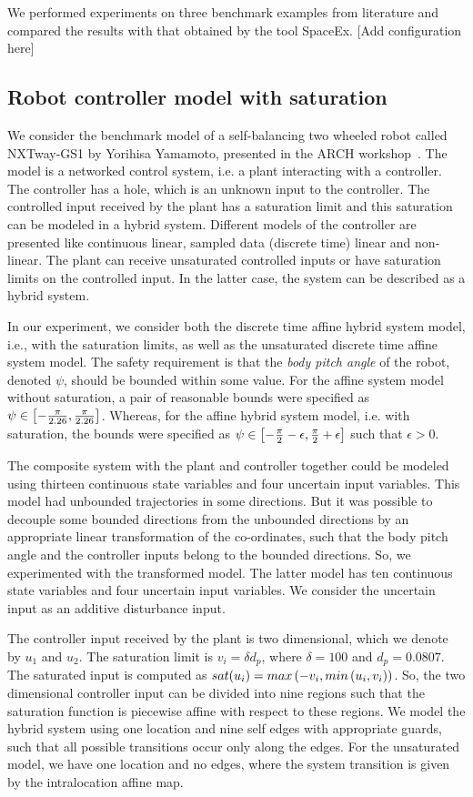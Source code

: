 We performed experiments on three benchmark examples from literature
and compared the results with that obtained by the tool SpaceEx. [Add
  configuration here]

\subsection{Robot controller model with saturation}   We consider the benchmark
model of a self-balancing two wheeled robot called NXTway-GS1 by
Yorihisa Yamamoto, presented in the ARCH workshop~\cite{TODO}.  The
model is a networked control system, i.e. a plant interacting with a
controller.  The controller has a hole, which is an unknown input to
the controller.  The controlled input received by the plant has a
saturation limit and this saturation can be modeled in a hybrid
system.  Different models of the controller are presented like
continuous linear, sampled data (discrete time) linear and non-linear.
The plant can receive unsaturated controlled inputs or have saturation
limits on the controlled input.  In the latter case, the system can be
described as a hybrid system.

In our experiment, we consider both the discrete time affine hybrid
system model, i.e., with the saturation limits, as well as the
unsaturated discrete time affine system model.  The safety requirement
is that the \emph{body pitch angle} of the robot, denoted $\psi$,
should be bounded within some value.  For the affine system model
without saturation, a pair of reasonable bounds were specified as
$\psi\in\left[-\frac{\pi}{2.26},\frac{\pi}{2.26}\right]$.  Whereas, for the
affine hybrid system model, i.e. with saturation, the bounds were
specified as
$\psi\in\left[-\frac{\pi}{2}-\epsilon,\frac{\pi}{2}+\epsilon\right]$ such
that $\epsilon>0$.

The composite system with the plant and controller together could be
modeled using thirteen continuous state variables and four uncertain input
variables.  This model had unbounded trajectories in some
directions.  But it was possible to decouple some bounded
directions from the unbounded directions by an appropriate linear
transformation of the co-ordinates, such that the body pitch angle and the
controller inputs belong to the bounded directions.  So, we
experimented with the transformed model.  The latter model has ten
continuous state variables and four uncertain input variables.  We consider
the uncertain input as an additive disturbance input.

The controller input received by the plant is two dimensional, which
we denote by $u_1$ and $u_2$.  The saturation limit is $v_i=\delta
d_p$, where $\delta=100$ and $d_p=0.0807$.  The saturated input is
computed as $sat(u_i) = max\left(-v_i,min\left(u_i,v_i\right)\right)$.  So, the
two dimensional controller input can be divided into nine regions such
that the saturation function is piecewise affine with respect to these
regions.  We model the hybrid system using one location and nine self
edges with appropriate guards, such that all possible transitions
occur only along the edges.  For the unsaturated model, we have one
location and no edges, where the system transition is given by the
intralocation affine map.
\vspace{0.2em}

